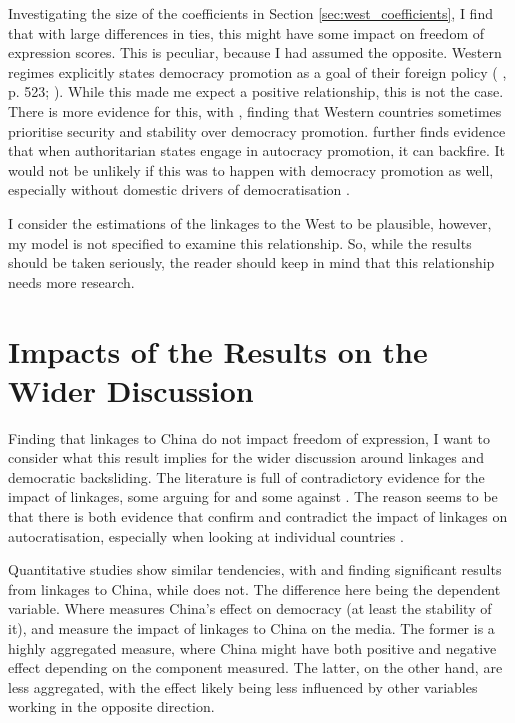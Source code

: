 Investigating the size of the coefficients in Section \ref{sec:west_coefficients}, I find that with large differences in ties, this might have some impact on freedom of expression scores. This is peculiar, because I had assumed the opposite. Western regimes explicitly states democracy promotion as a goal of their foreign policy (\citeauthor{borzel_noble_2015} \citeyear{borzel_noble_2015}, p. 523; \citeauthor{levitsky_linkage_2006} \citeyear{levitsky_linkage_2006}). While this made me expect a positive relationship, this is not the case. There is more evidence for this, with \citet[pp. 523-524]{borzel_noble_2015}, \citet[pp. 464-466]{delcour_spoiler_2015} \citet{freyburg_local_2015} finding that Western countries sometimes prioritise security and stability over democracy promotion. \citet{delcour_spoiler_2015} further finds evidence that when authoritarian states engage in autocracy promotion, it can backfire. It would not be unlikely if this was to happen with democracy promotion as well, especially without domestic drivers of democratisation \citep{risse_democracy_2015}.

I consider the estimations of the linkages to the West to be plausible, however, my model is not specified to examine this relationship. So, while the results should be taken seriously, the reader should keep in mind that this relationship needs more research.

\section{Impacts of the Results on the Wider Discussion}
Finding that linkages to China do not impact freedom of expression, I want to consider what this result implies for the wider discussion around linkages and democratic backsliding. The literature is full of contradictory evidence for the impact of linkages, some arguing for \citep{gamso_is_2021, loughlin_chinese_2021, toettoe_foreign_2023} and some against \citep{brownlee_limited_2017, wong_chinese_2019, yilmaz_authoritarian_2020}. The reason seems to be that there is both evidence that confirm and contradict the impact of linkages on autocratisation, especially when looking at individual countries \citep{loughlin_chinese_2021, yilmaz_authoritarian_2020, wong_chinese_2019}. 

Quantitative studies show similar tendencies, with \citet{gamso_is_2021} and \citet{toettoe_foreign_2023} finding significant results from linkages to China, while \citep{bader_china_2015} does not. The difference here being the dependent variable. Where \citet{bader_china_2015} measures China's effect on democracy (at least the stability of it), \citet{gamso_is_2021} and \citet{toettoe_foreign_2023} measure the impact of linkages to China on the media. The former is a highly aggregated measure, where China might have both positive and negative effect depending on the component measured. The latter, on the other hand, are less aggregated, with the effect likely being less influenced by other variables working in the opposite direction.

